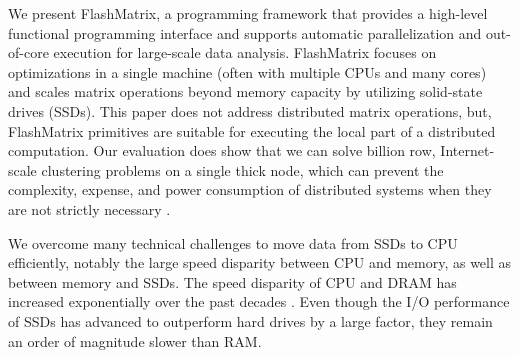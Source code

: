 

We present FlashMatrix, a programming framework that provides a high-level
functional programming interface and supports automatic
parallelization and out-of-core execution for large-scale data analysis.
FlashMatrix focuses on optimizations in a single machine (often with multiple
CPUs and many cores) and scales matrix operations beyond memory capacity by 
utilizing solid-state drives (SSDs).  
This paper does not address distributed matrix operations, but, 
FlashMatrix primitives are suitable for executing the local part of a distributed 
computation.   
Our evaluation does show that we can solve billion row, Internet-scale 
clustering problems on a single thick node, which can prevent the complexity,
expense, and power consumption of distributed systems when they are not strictly necessary
\cite{hotos}.








We overcome many technical challenges to move data from SSDs to CPU efficiently,
notably the large speed disparity between CPU and memory, as well as between
memory and SSDs. The speed disparity of CPU and DRAM has increased exponentially
over the past decades \cite{Wilkes01}.
Even though the I/O performance of SSDs
has advanced to outperform hard drives by a large factor, they remain an order
of magnitude slower than RAM.  

